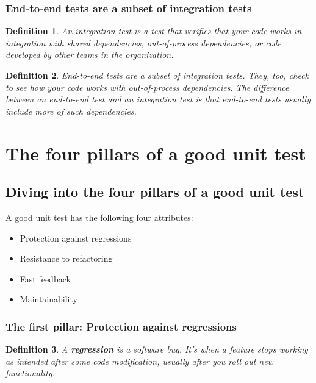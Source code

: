 \documentclass{article}
\newtheorem{definition}{Definition}
\begin{document}
\subsubsection{ End-to-end tests are a subset of integration tests}

\begin{definition}
An integration test is a test that verifies that your code works in integration with shared dependencies, out-of-process dependencies, or code developed by other teams in the organization.
\end{definition}

\begin{definition}
End-to-end tests are a subset of integration tests. They, too, check to see how your code works with out-of-process dependencies. The difference between an end-to-end test and an integration test is that end-to-end tests usually include more of such dependencies.
\end{definition}

\section{The four pillars of a good unit test}

\subsection{Diving into the four pillars of a good unit test}

A good unit test has the following four attributes:
\begin{itemize}
	\item Protection against regressions
	\item Resistance to refactoring
	\item Fast feedback
	\item Maintainability
\end{itemize}

\subsubsection{The first pillar: Protection against regressions}

\begin{definition}
A \textbf{regression} \cite{regression_testing_in_practice} is a software bug. It’s when a feature stops working as intended after some code modification, usually after you roll out new functionality.
\end{definition}
\end{document}
